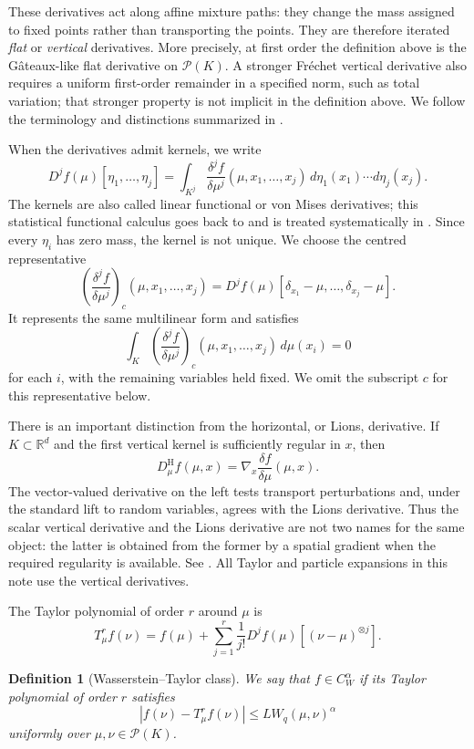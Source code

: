 \documentclass[11pt]{article}
\newtheorem{definition}{Definition}
\newcommand{\Pcal}{\mathcal P}
\newcommand{\R}{\mathbb R}
\begin{document}
These derivatives act along affine mixture paths: they change the mass
assigned to fixed points rather than transporting the points. They are
therefore iterated \emph{flat} or \emph{vertical} derivatives. More
precisely, at first order the definition above is the Gâteaux-like flat
derivative on \(\Pcal(K)\). A stronger Fréchet vertical derivative also
requires a uniform first-order remainder in a specified norm, such as
total variation; that stronger property is not implicit in the
definition above. We follow the terminology and distinctions summarized
in \cite{bertucci}.

When the derivatives admit kernels, we write
\[
D^jf(\mu)[\eta_1,\ldots,\eta_j]
=
\int_{K^j}
\frac{\delta^j f}{\delta\mu^j}
(\mu,x_1,\ldots,x_j)
\,d\eta_1(x_1)\cdots d\eta_j(x_j).
\]
The kernels are also called linear functional or von Mises derivatives;
this statistical functional calculus goes back to
\cite{von-mises} and is treated systematically in \cite{serfling}.
Since every \(\eta_i\) has zero mass, the kernel is not unique. We choose
the centred representative
\[
\left(\frac{\delta^j f}{\delta\mu^j}\right)_{\!c}
(\mu,x_1,\ldots,x_j)
=
D^jf(\mu)
[\delta_{x_1}-\mu,\ldots,\delta_{x_j}-\mu].
\]
It represents the same multilinear form and satisfies
\[
\int_K
\left(\frac{\delta^j f}{\delta\mu^j}\right)_{\!c}
(\mu,x_1,\ldots,x_j)\,d\mu(x_i)
=0
\]
for each \(i\), with the remaining variables held fixed.
We omit the subscript \(c\) for this representative below.

There is an important distinction from the horizontal, or Lions,
derivative. If \(K\subset\R^d\) and the first vertical kernel is
sufficiently regular in \(x\), then
\[
D_\mu^{\mathrm H}f(\mu,x)
=
\nabla_x\frac{\delta f}{\delta\mu}(\mu,x).
\]
The vector-valued derivative on the left tests transport perturbations
and, under the standard lift to random variables, agrees with the Lions
derivative. Thus the scalar vertical derivative and the Lions derivative
are not two names for the same object: the latter is obtained from the
former by a spatial gradient when the required regularity is available.
See \cite{bertucci,carmona-delarue}. All Taylor and particle expansions
in this note use the vertical derivatives.

The Taylor polynomial of order \(r\) around \(\mu\) is
\[
T_\mu^r f(\nu)
=
f(\mu)
+
\sum_{j=1}^r
\frac1{j!}
D^jf(\mu)
\left[(\nu-\mu)^{\otimes j}\right].
\]

\begin{definition}[Wasserstein--Taylor class]
We say that \(f\in C_W^\alpha\) if its Taylor polynomial of order \(r\)
satisfies
\[
\left|
f(\nu)-T_\mu^r f(\nu)
\right|
\leq
L W_q(\mu,\nu)^\alpha
\]
uniformly over \(\mu,\nu\in\Pcal(K)\).
\end{definition}
\end{document}
